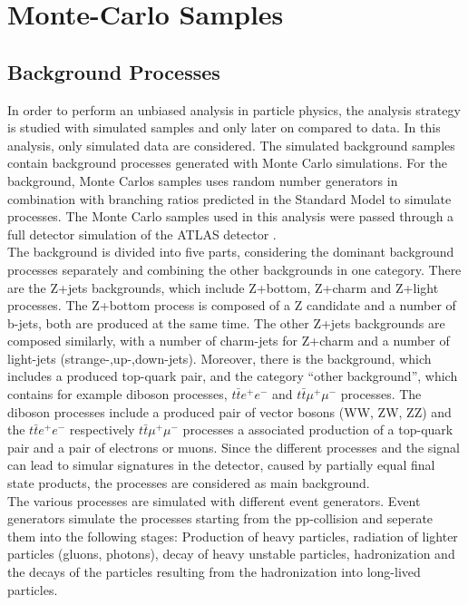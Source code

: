 \chapter{Monte-Carlo Samples}

\section{Background Processes}
\label{samples}
In order to perform an unbiased analysis in particle physics, the analysis strategy is studied with simulated samples and only later on compared to data.
In this analysis, only simulated data are considered.
The simulated background samples contain background processes generated with Monte Carlo simulations.
For the background,  Monte Carlos samples uses random number generators in combination with branching ratios predicted in the Standard Model to simulate processes.
The Monte Carlo samples used in this analysis were passed through a full detector simulation of the ATLAS detector \cite{simulation1, simulation2}.\\
The background is divided into five parts, considering the dominant background processes separately and combining the other backgrounds in one category.
There are the Z+jets backgrounds, which include Z+bottom, Z+charm and Z+light processes.
The Z+bottom process is composed of a Z candidate and a number of b-jets, both are produced at the same time.
The other Z+jets backgrounds are composed similarly, with a number of charm-jets for Z+charm and a number of light-jets (strange-,up-,down-jets).
Moreover, there is the \ttbar{} background, which includes a produced top-quark pair, and the category ``other background'', which contains for example diboson processes, $t \bar{t} e^{+}\!e^{-}$ and $t \bar{t} \mu^{+}\!\mu^{-}$ processes.
The diboson processes include a produced pair of vector bosons (WW, ZW, ZZ) and the $t \bar{t} e^{+}\!e^{-}$ respectively $t \bar{t} \mu^{+}\!\mu^{-}$ processes a associated production of a top-quark pair and a pair of electrons or muons.
Since the different processes and the signal can lead to simular signatures in the detector, caused by partially equal final state products, the processes are considered as main background. \\
The various processes are simulated with different event generators.
Event generators simulate the processes starting from the pp-collision and seperate them into the following stages:
Production of heavy particles, radiation of lighter particles (gluons, photons), decay of heavy unstable particles, hadronization and the decays of the particles resulting from the hadronization into long-lived particles. 
